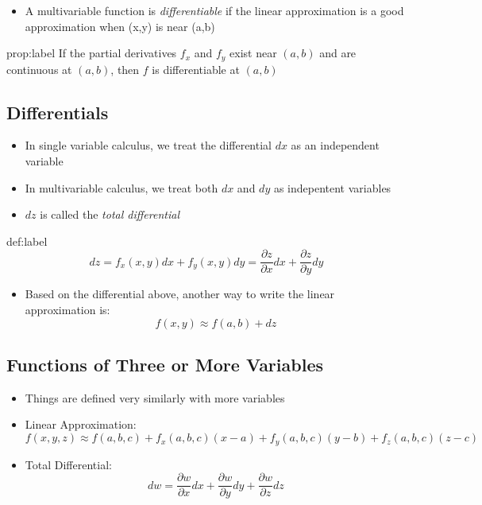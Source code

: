 \documentclass{package/notes}
\begin{document}
\begin{itemize}
	\item A multivariable function is \textit{differentiable} if the linear approximation is a good approximation when (x,y) is near (a,b)
\end{itemize}

\begin{proposition}{prop:label}
	If the partial derivatives $f_x$ and $f_y$ exist near $(a,b)$ and are continuous at $(a,b)$, then $f$ is differentiable at $(a,b)$
\end{proposition}


\subsection{Differentials}

\begin{itemize}
	\item In single variable calculus, we treat the differential $dx$ as an independent variable
	\item In multivariable calculus, we treat both $dx$ and $dy$ as indepentent variables
	\item $dz$ is called the \textit{total differential}
\end{itemize}

\begin{definition}[Differentials]{def:label}
	$$dz = f_x(x,y)dx+f_y(x,y)dy=\frac{\partial z}{\partial x}dx + \frac{\partial z}{\partial y}dy$$
\end{definition}

\begin{itemize}
	\item Based on the differential above, another way to write the linear approximation is: $$f(x,y) \approx f(a,b) + dz$$
\end{itemize}


\subsection{Functions of Three or More Variables}

\begin{itemize}
	\item Things are defined very similarly with more variables
	\item Linear Approximation: $$f(x,y,z) \approx f(a,b,c)+f_x(a,b,c)(x-a)+f_y(a,b,c)(y-b)+f_z(a,b,c)(z-c)$$
	\item Total Differential: $$dw = \frac{\partial w}{\partial x}dx + \frac{\partial w}{\partial y}dy + \frac{\partial w}{\partial z}dz$$
\end{itemize}
\end{document}
